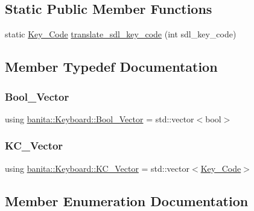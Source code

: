 \subsection*{Static Public Member Functions}
\begin{DoxyCompactItemize}
\item 
static \mbox{\hyperlink{classbanita_1_1_keyboard_a0dee214e6cb4f246866603b85568b9ab}{Key\+\_\+\+Code}} \mbox{\hyperlink{classbanita_1_1_keyboard_ae0d0b78dbb5407e23fa2135be19bf903}{translate\+\_\+sdl\+\_\+key\+\_\+code}} (int sdl\+\_\+key\+\_\+code)
\end{DoxyCompactItemize}


\subsection{Member Typedef Documentation}
\mbox{\label{classbanita_1_1_keyboard_a0bd55b31db3e776ec4c8a2effc5b3cd8}} 
\subsubsection{\texorpdfstring{Bool\_Vector}{Bool\_Vector}}
{\footnotesize\ttfamily using \mbox{\hyperlink{classbanita_1_1_keyboard_a0bd55b31db3e776ec4c8a2effc5b3cd8}{banita\+::\+Keyboard\+::\+Bool\+\_\+\+Vector}} =  std\+::vector$<$bool$>$}

\mbox{\label{classbanita_1_1_keyboard_ac39ec62a0a07ee3e90cc742b6b2ecb97}} 
\subsubsection{\texorpdfstring{KC\_Vector}{KC\_Vector}}
{\footnotesize\ttfamily using \mbox{\hyperlink{classbanita_1_1_keyboard_ac39ec62a0a07ee3e90cc742b6b2ecb97}{banita\+::\+Keyboard\+::\+K\+C\+\_\+\+Vector}} =  std\+::vector$<$\mbox{\hyperlink{classbanita_1_1_keyboard_a0dee214e6cb4f246866603b85568b9ab}{Key\+\_\+\+Code}}$>$}



\subsection{Member Enumeration Documentation}
\mbox{\label{classbanita_1_1_keyboard_a0dee214e6cb4f246866603b85568b9ab}} 
